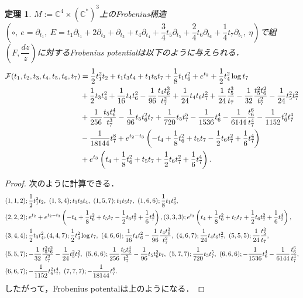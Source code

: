 \documentclass[a4paper,11pt]{jbook}
\theoremstyle{plain}
\newtheorem{thm}{定理}[section]
\theoremstyle{definition}
\theoremstyle{remark}
\theoremstyle{proof}
\numberwithin{equation}{section}
\def\CC{{\mathbb C}}
\def\F{{\mathcal F}}
\begin{document}
\begin{thm}\label{mu5pot}
$M:=\CC^4\times(\CC^*)^3$上の\rm{Frobenius構造}$(\circ, \ e=\partial_{t_1}, \ E=t_1\partial_{t_1}+2\partial_{t_2}+\partial_{t_3}+t_4\partial_{t_4}+\dfrac{3}{4}t_5\partial_{t_5}+\dfrac{2}{4}t_6\partial_{t_6}+\dfrac{1}{4}t_7\partial_{t_7}, \ \eta)$で組$\left(F,\dfrac{dz}{z}\right)$に対するFrobenius potentialは以下のように与えられる．
\begin{align}
	\F(t_1,t_2,t_3,t_4,t_5,t_6,t_7)&=\frac{1}{2}t_1^2t_2 +t_1t_3t_4 +t_1t_5t_7 +\frac{1}{8}t_1t_6^2 +e^{t_2}+\dfrac{1}{2}t_4^2\log{t_7} \notag \\
&+\dfrac{1}{2}t_3t_4^2+\frac{1}{16}t_4t_6^2-\dfrac{1}{96}\frac{t_4t_6^3}{t_7^2}+\dfrac{1}{24}t_4t_6t_7^2 +\frac{1}{24}\frac{t_5^3}{t_7} -\frac{1}{32}\frac{t_5^2t_6^2}{t_7^2}-\frac{1}{24}t_5^2t_7^2 \notag \\
&+\frac{1}{256}\frac{t_5t_6^4}{t_7^3}-\frac{1}{96}t_5t_6^2t_7 +\frac{1}{720}t_5t_7^5 -\frac{1}{1536}t_6^4-\frac{1}{6144}\frac{t_6^6}{t_7^4} -\frac{1}{1152}t_6^2t_7^4  \notag \\
&-\frac{1}{18144}t_7^8+e^{t_2-t_3}\left(-t_4+\frac{1}{8}t_6^2+t_5t_7-\frac{1}{2}t_6t_7^2+\frac{1}{6}t_7^4 \right) \notag \\
&+e^{t_3}\left(t_4+\frac{1}{8}t_6^2+t_5t_7+\frac{1}{2}t_6t_7^2+\frac{1}{6}t_7^4 \right).
\end{align}
\end{thm}

\begin{proof}
次のように計算できる． 
\begin{align}
&(1,1,2) ; \dfrac{1}{2}t_1^2t_2, \ (1,3,4) ; t_1t_3t_4, \ (1,5,7) ; t_1t_5t_7, \ (1,6,6) ; \frac{1}{8}t_1t_6^2, \notag \\
&(2,2,2);e^{t_2}+e^{t_2-t_3}\left(-t_4+\frac{1}{8}t_6^2+t_5t_7-\frac{1}{2}t_6t_7^2+\frac{1}{6}t_7^4 \right), 
(3,3,3) ; e^{t_3}\left(t_4+\frac{1}{8}t_6^2+t_5t_7+\frac{1}{2}t_6t_7^2+\frac{1}{6}t_7^4 \right), \notag \\
&(3,4,4) ; \dfrac{1}{2}t_3t_4^2, (4,4,7) ; \dfrac{1}{2}t_4^2\log{t_7}, \ (4,6,6) ; \frac{1}{16}t_4t_6^2-\dfrac{1}{96}\frac{t_4t_6^3}{t_7^2}, \ (4,6,7) ; \dfrac{1}{24}t_4t_6t_7^2, \ (5,5,5) ; \frac{1}{24}\frac{t_5^3}{t_7}, \notag \\
&(5,5,7) ; -\frac{1}{32}\frac{t_5^2t_6^2}{t_7^2}-\frac{1}{24}t_5^2t_7^2, 
\ (5,6,6) ; \frac{1}{256}\frac{t_5t_6^4}{t_7^3}-\frac{1}{96}t_5t_6^2t_7, 
\ (5,7,7) ; \frac{1}{720}t_5t_7^5, 
\ (6,6,6) ; -\frac{1}{1536}t_6^4-\frac{1}{6144}\frac{t_6^6}{t_7^4},  \notag\\
&(6,6,7) ; -\frac{1}{1152}t_6^2t_7^4, \ (7,7,7) ; -\frac{1}{18144}t_7^8. \notag
\end{align}
したがって，Frobenius potentalは上のようになる．
\end{proof}
\end{document}
